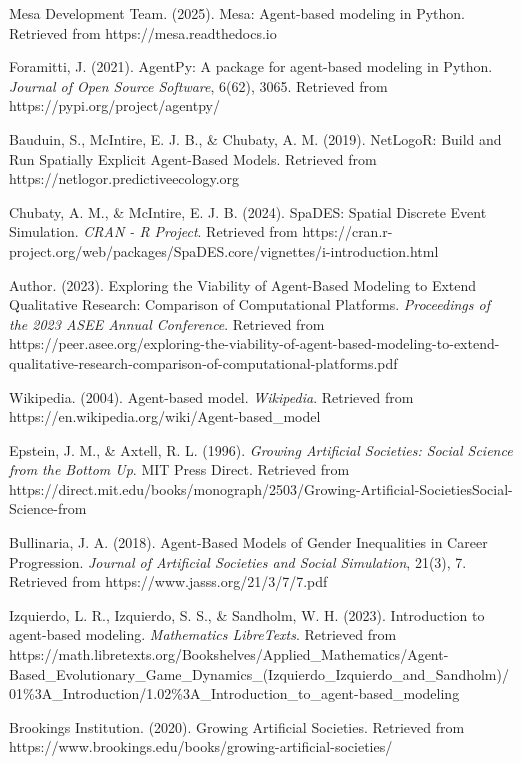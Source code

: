 \documentclass[main.tex]{subfiles}
\begin{document}
\begin{thebibliography}{20}
Mesa Development Team. (2025). Mesa: Agent-based modeling in Python. Retrieved from https://mesa.readthedocs.io

Foramitti, J. (2021). AgentPy: A package for agent-based modeling in Python. \textit{Journal of Open Source Software}, 6(62), 3065. Retrieved from https://pypi.org/project/agentpy/

Bauduin, S., McIntire, E. J. B., \& Chubaty, A. M. (2019). NetLogoR: Build and Run Spatially Explicit Agent-Based Models. Retrieved from https://netlogor.predictiveecology.org

Chubaty, A. M., \& McIntire, E. J. B. (2024). SpaDES: Spatial Discrete Event Simulation. \textit{CRAN - R Project}. Retrieved from https://cran.r-project.org/web/packages/SpaDES.core/vignettes/i-introduction.html

Author. (2023). Exploring the Viability of Agent-Based Modeling to Extend Qualitative Research: Comparison of Computational Platforms. \textit{Proceedings of the 2023 ASEE Annual Conference}. Retrieved from https://peer.asee.org/exploring-the-viability-of-agent-based-modeling-to-extend-qualitative-research-comparison-of-computational-platforms.pdf

Wikipedia. (2004). Agent-based model. \textit{Wikipedia}. Retrieved from https://en.wikipedia.org/wiki/Agent-based\_model

Epstein, J. M., \& Axtell, R. L. (1996). \textit{Growing Artificial Societies: Social Science from the Bottom Up}. MIT Press Direct. Retrieved from https://direct.mit.edu/books/monograph/2503/Growing-Artificial-SocietiesSocial-Science-from

Bullinaria, J. A. (2018). Agent-Based Models of Gender Inequalities in Career Progression. \textit{Journal of Artificial Societies and Social Simulation}, 21(3), 7. Retrieved from https://www.jasss.org/21/3/7/7.pdf

Izquierdo, L. R., Izquierdo, S. S., \& Sandholm, W. H. (2023). Introduction to agent-based modeling. \textit{Mathematics LibreTexts}. Retrieved from https://math.libretexts.org/Bookshelves/Applied\_Mathematics/Agent-Based\_Evolutionary\_Game\_Dynamics\_(Izquierdo\_Izquierdo\_and\_Sandholm)/01\%3A\_Introduction/1.02\%3A\_Introduction\_to\_agent-based\_modeling

Brookings Institution. (2020). Growing Artificial Societies. Retrieved from https://www.brookings.edu/books/growing-artificial-societies/


\end{thebibliography}
\end{document}
